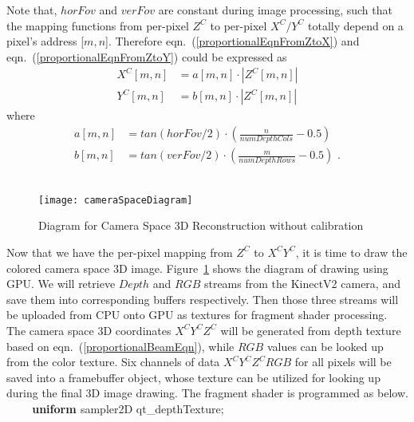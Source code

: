 \noindent
Note that, \(horFov\) and \(verFov\) are constant during image processing, such that the mapping functions from per-pixel \(Z^C\) to per-pixel \(X^C/Y^C\) totally depend on a pixel's address [\(m, n\)]. Therefore eqn.~(\ref{proportionalEqnFromZtoX}) and eqn.~(\ref{proportionalEqnFromZtoY}) could be expressed as 
%
\begin{equation}
\begin{aligned}
X^C[m, n] &= a[m, n] \cdot |Z^C[m, n]|
\\%
Y^C[m, n] &= b[m, n] \cdot |Z^C[m, n]| 
\end{aligned}
\label{proportionalBeamEqn}
\end{equation}%
\noindent
where
%
\begin{equation}
\begin{aligned}
a[m, n] &= tan(horFov / 2) \cdot (\frac{n}{numDepthCols} - 0.5)
\\%
b[m, n] &= tan(verFov / 2) \cdot (\frac{m}{numDepthRows} - 0.5) \, \, .
\end{aligned}
\label{parametersABofProportional}
\end{equation}%
\\\indent
%
\begin{figure}[!t]
\centering
\texttt{[image: cameraSpaceDiagram]}
\caption{Diagram for Camera Space 3D Reconstruction without calibration}
\label{cameraSpaceDiagram}
\end{figure}%
%
Now that we have the per-pixel mapping from \(Z^C\) to \(X^CY^C\), it is time to draw the colored camera space 3D image. Figure~\ref{cameraSpaceDiagram} shows the diagram of drawing using GPU. We will retrieve \(Depth\) and \(RGB\) streams from the KinectV2 camera, and save them into corresponding buffers respectively. Then those three streams will be uploaded from CPU onto GPU as textures for fragment shader processing. The camera space 3D coordinates \(X^CY^CZ^C\) will be generated from depth texture based on eqn.~(\ref{proportionalBeamEqn}), while \(RGB\) values can be looked up from the color texture. Six channels of data \(X^CY^CZ^CRGB\) for all pixels will be saved into a framebuffer object, whose texture can be utilized for looking up during the final 3D image drawing. The fragment shader is programmed as below.
\\%
{\ttfamily
\textbf{\textcolor[rgb]{0.5019608,0.5019608,0.0}{\ \ \ \ uniform } }\textcolor[rgb]{0.7529412,0.7529412,0.7529412}{
 }\textcolor[rgb]{0.5019608,0.5019608,0.0}{sampler2D }\textcolor[rgb]{0.7529412,0.7529412,0.7529412}{
}qt\_depthTexture;\textcolor[rgb]{0.7529412,0.7529412,0.7529412}{
\ \ }}

